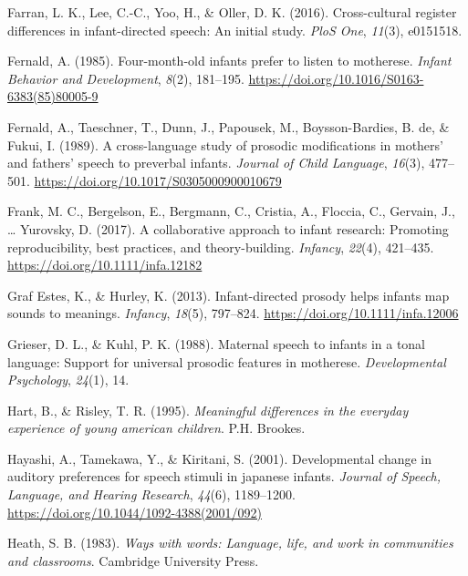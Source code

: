 \documentclass[
  ,man,floatsintext]{apa6}
\newlength{\cslhangindent}
\newlength{\cslentryspacingunit} %
\newenvironment{CSLReferences}[2] %
 {%
  \setlength{\parindent}{0pt}
  \ifodd #1
  \let\oldpar\par
  \def\par{\hangindent=\cslhangindent\oldpar}
  \fi
  \setlength{\parskip}{#2\cslentryspacingunit}
 }%
 {}
\begin{document}
\begin{CSLReferences}{1}{0}
\leavevmode{}%
Farran, L. K., Lee, C.-C., Yoo, H., \& Oller, D. K. (2016). Cross-cultural register differences in infant-directed speech: An initial study. \emph{PloS One}, \emph{11}(3), e0151518.

\leavevmode{}%
Fernald, A. (1985). Four-month-old infants prefer to listen to motherese. \emph{Infant Behavior and Development}, \emph{8}(2), 181--195. \url{https://doi.org/10.1016/S0163-6383(85)80005-9}

\leavevmode{}%
Fernald, A., Taeschner, T., Dunn, J., Papousek, M., Boysson-Bardies, B. de, \& Fukui, I. (1989). A cross-language study of prosodic modifications in mothers' and fathers' speech to preverbal infants. \emph{Journal of Child Language}, \emph{16}(3), 477--501. \url{https://doi.org/10.1017/S0305000900010679}

\leavevmode{}%
Frank, M. C., Bergelson, E., Bergmann, C., Cristia, A., Floccia, C., Gervain, J., \ldots{} Yurovsky, D. (2017). A collaborative approach to infant research: Promoting reproducibility, best practices, and theory-building. \emph{Infancy}, \emph{22}(4), 421--435. \url{https://doi.org/10.1111/infa.12182}

\leavevmode{}%
Graf Estes, K., \& Hurley, K. (2013). Infant-directed prosody helps infants map sounds to meanings. \emph{Infancy}, \emph{18}(5), 797--824. \url{https://doi.org/10.1111/infa.12006}

\leavevmode{}%
Grieser, D. L., \& Kuhl, P. K. (1988). Maternal speech to infants in a tonal language: Support for universal prosodic features in motherese. \emph{Developmental Psychology}, \emph{24}(1), 14.

\leavevmode{}%
Hart, B., \& Risley, T. R. (1995). \emph{Meaningful differences in the everyday experience of young american children}. P.H. Brookes.

\leavevmode{}%
Hayashi, A., Tamekawa, Y., \& Kiritani, S. (2001). Developmental change in auditory preferences for speech stimuli in japanese infants. \emph{Journal of Speech, Language, and Hearing Research}, \emph{44}(6), 1189--1200. \url{https://doi.org/10.1044/1092-4388(2001/092)}

\leavevmode{}%
Heath, S. B. (1983). \emph{Ways with words: Language, life, and work in communities and classrooms}. Cambridge University Press.


\end{CSLReferences}
\end{document}
